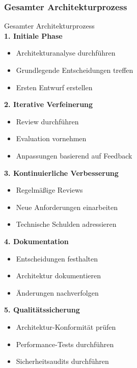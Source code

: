 \subsubsection{Gesamter Architekturprozess}

\begin{KR}{Gesamter Architekturprozess}\\
\textbf{1. Initiale Phase}
\begin{itemize}
    \item Architekturanalyse durchführen
    \item Grundlegende Entscheidungen treffen
    \item Ersten Entwurf erstellen
\end{itemize}

\textbf{2. Iterative Verfeinerung}
\begin{itemize}
    \item Review durchführen
    \item Evaluation vornehmen
    \item Anpassungen basierend auf Feedback
\end{itemize}

\textbf{3. Kontinuierliche Verbesserung}
\begin{itemize}
    \item Regelmäßige Reviews
    \item Neue Anforderungen einarbeiten
    \item Technische Schulden adressieren
\end{itemize}

\textbf{4. Dokumentation}
\begin{itemize}
    \item Entscheidungen festhalten
    \item Architektur dokumentieren
    \item Änderungen nachverfolgen
\end{itemize}

\textbf{5. Qualitätssicherung}
\begin{itemize}
    \item Architektur-Konformität prüfen
    \item Performance-Tests durchführen
    \item Sicherheitsaudits durchführen
\end{itemize}
\end{KR}

